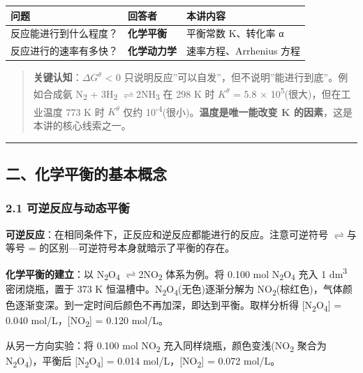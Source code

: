 \documentclass[a4paper,11pt]{ctexart}
\newcounter{none}
\newcommand{\箭}{\ensuremath{\rightarrow}}
\newcommand{\左箭}{\ensuremath{\leftarrow}}
\newcommand{\上箭}{\ensuremath{\uparrow}}
\newcommand{\下箭}{\ensuremath{\downarrow}}
\newcommand{\衡}{\ensuremath{\rightleftharpoons}}
\newcommand{\双箭}{\ensuremath{\leftrightarrow}}
\newcommand{\约等于}{\ensuremath{\approx}}
\newcommand{\小于等于}{\ensuremath{\leq}}
\newcommand{\大于等于}{\ensuremath{\geq}}
\newcommand{\不等于}{\ensuremath{\neq}}
\newcommand{\西格马}{\ensuremath{\sigma}}
\newcommand{\派}{\ensuremath{\pi}}
\begin{document}
{\def\LTcaptype{none} %
\begin{longtable}[]{@{}lll@{}}
\toprule\noalign{}
问题 & 回答者 & 本讲内容 \\
\midrule\noalign{}
\endhead
\bottomrule\noalign{}
\endlastfoot
反应能进行到什么程度？ & \textbf{化学平衡} & 平衡常数 K、转化率 α \\
反应进行的速率有多快？ & \textbf{化学动力学} & 速率方程、Arrhenius 方程 \\
\end{longtable}
}

\begin{quote}
\textbf{关键认知}：\(\Delta G^\theta\) \textless{} 0 只说明反应''可以自发''，但不说明''能进行到底''。例如合成氨 N\textsubscript{2} + 3H\textsubscript{2} \衡 2NH\textsubscript{3} 在 298 K 时 \(K^\theta\) = 5.8 × 10\textsuperscript{5}(很大)，但在工业温度 773 K 时 \(K^\theta\) 仅约 10\textsuperscript{-4}(很小)。\textbf{温度是唯一能改变 K 的因素}，这是本讲的核心线索之一。
\end{quote}

\begin{center}\rule{0.5\linewidth}{0.5pt}\end{center}

\subsection{二、化学平衡的基本概念}\label{ux4e8cux5316ux5b66ux5e73ux8861ux7684ux57faux672cux6982ux5ff5}

\subsubsection{2.1 可逆反应与动态平衡}\label{ux53efux9006ux53cdux5e94ux4e0eux52a8ux6001ux5e73ux8861}

\textbf{可逆反应}：在相同条件下，正反应和逆反应都能进行的反应。注意可逆符号 \衡 与等号 = 的区别---可逆符号本身就暗示了平衡的存在。

\textbf{化学平衡的建立}：以 N\textsubscript{2}O\textsubscript{4} \衡 2NO\textsubscript{2} 体系为例。将 0.100 mol N\textsubscript{2}O\textsubscript{4} 充入 1 dm\textsuperscript{3} 密闭烧瓶，置于 373 K 恒温槽中。N\textsubscript{2}O\textsubscript{4}(无色)逐渐分解为 NO\textsubscript{2}(棕红色)，气体颜色逐渐变深。到一定时间后颜色不再加深，即达到平衡。取样分析得 {[}N\textsubscript{2}O\textsubscript{4}{]} = 0.040 mol/L，{[}NO\textsubscript{2}{]} = 0.120 mol/L。

从另一方向实验：将 0.100 mol NO\textsubscript{2} 充入同样烧瓶，颜色变浅(NO\textsubscript{2} 聚合为 N\textsubscript{2}O\textsubscript{4})，平衡后 {[}N\textsubscript{2}O\textsubscript{4}{]} = 0.014 mol/L，{[}NO\textsubscript{2}{]} = 0.072 mol/L。
\end{document}
